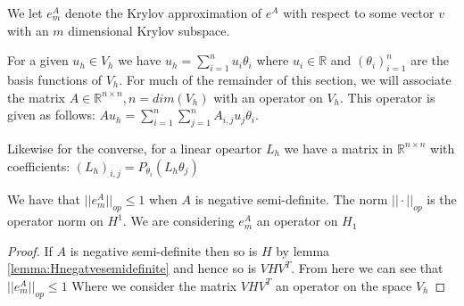 \begin{definition}
    We let $e_m^A$ denote the Krylov approximation of $e^A$ with respect to some vector $v$ with an $m$ dimensional Krylov subspace.
\end{definition}

For a given $u_h \in V_h$ we have $u_h = \sum^n_{i=1}u_i\theta_i$ where $u_i \in \mathbb{R}$ and $(\theta_i)_{i=1}^n$ are the basis functions of $V_h$.
For much of the remainder of this section, we will associate the matrix $A\in \mathbb{R}^{n\times n}, n=dim(V_h)$ with an operator on $V_h$.
This operator is given as follows: $Au_h = \sum^n_{i=1}\sum^n_{j=1}A_{i,j}u_j\theta_i$.

Likewise for the converse, for a linear opeartor $L_h$ we have a matrix in $\mathbb{R}^{n\times n}$ with coefficients:
$(L_h)_{i,j} = P_{\theta_i}(L_h\theta_j)$

\begin{lemma} \label{lemma:leqm}
    We have that $||e_m^A||_{op} \leq 1$ when $A$ is negative semi-definite.
    The norm $||\cdot||_{op}$ is the operator norm on $H^1$.
    We are considering $e_m^A$ an operator on $H_1$
\end{lemma}
\begin{proof}
    If $A$ is negative semi-definite then so is $H$ by lemma \ref{lemma:Hnegatvesemidefinite} and hence so is $VHV^T$.
    From here we can see that $||e_m^A||_{op} \leq 1$
    Where we consider the matrix $VHV^T$ an operator on the space $V_h$
\end{proof}

